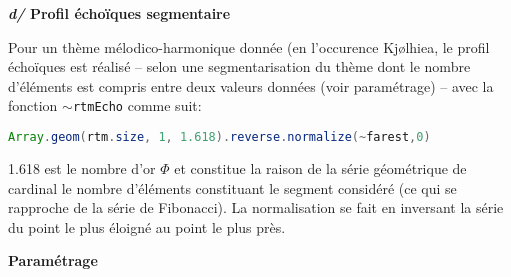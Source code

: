    \bigskip

  \textbf{\textit{d/ } Profil \'echo\"iques segmentaire }
  
  \smallskip
  Pour un th\`eme m\'elodico-harmonique donn\'ee (en l'occurence Kj{\o}lhiea, le profil \'echo\"iques est r\'ealis\'e -- selon une segmentarisation du th\`eme dont le nombre d'\'el\'ements est compris entre deux valeurs donn\'ees (voir param\'etrage) -- avec la fonction \texttt{$\sim$rtmEcho} comme suit:
\begin{lstlisting}[basicstyle=\footnotesize\ttfamily,language=Java]
Array.geom(rtm.size, 1, 1.618).reverse.normalize(~farest,0)
\end{lstlisting}

 1.618 est le nombre d'or $\Phi$ et constitue la raison de la s\'erie g\'eom\'etrique de cardinal le nombre d'\'el\'ements constituant le segment consid\'er\'e (ce qui se rapproche de la s\'erie de Fibonacci). La normalisation se fait en inversant la s\'erie du point le plus \'eloign\'e au point le plus pr\`es.
  
\bigskip

\noindent \textbf{{\large Param\'etrage}}
\hrulefill

\smallskip

